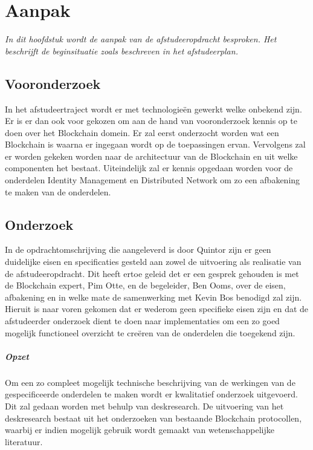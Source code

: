 \chapter{Aanpak}

\textit{In dit hoofdstuk wordt de aanpak van de afstudeeropdracht besproken. Het beschrijft de beginsituatie zoals beschreven in het afstudeerplan.}

\section{Vooronderzoek} In het afstudeertraject wordt er met technologieën gewerkt welke onbekend zijn. Er is er dan ook voor gekozen om aan de hand van vooronderzoek kennis op te doen over het Blockchain domein. Er zal eerst onderzocht worden wat een Blockchain is waarna er ingegaan wordt op de toepassingen ervan. Vervolgens zal er worden gekeken worden naar de architectuur van de Blockchain en uit welke componenten het bestaat. Uiteindelijk zal er kennis opgedaan worden voor de onderdelen Identity Management en Distributed Network om zo een afbakening te maken van de onderdelen.

\section{Onderzoek} In de opdrachtomschrijving die aangeleverd is door Quintor zijn er geen duidelijke eisen en specificaties gesteld aan zowel de uitvoering als realisatie van de afstudeeropdracht. Dit heeft ertoe geleid det er een gesprek gehouden is met de Blockchain expert, Pim Otte, en de begeleider, Ben Ooms, over de eisen, afbakening en in welke mate de samenwerking met Kevin Bos benodigd zal zijn. Hieruit is naar voren gekomen dat er wederom geen specifieke eisen zijn en dat de afstudeerder onderzoek dient te doen naar implementaties om een zo goed mogelijk functioneel overzicht te creëren van de onderdelen die toegekend zijn. 

\paragraph{Opzet} Om een zo compleet mogelijk technische beschrijving van de werkingen van de gespecificeerde onderdelen te maken wordt er kwalitatief onderzoek uitgevoerd. Dit zal gedaan worden met behulp van deskresearch. De uitvoering van het deskresearch bestaat uit het onderzoeken van bestaande Blockchain protocollen, waarbij er indien mogelijk gebruik wordt gemaakt van wetenschappelijke literatuur.

